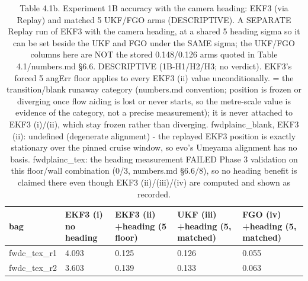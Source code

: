 \begin{table}[htbp]
\centering
\footnotesize
\caption{Table 4.1b. Experiment 1B accuracy with the camera heading: EKF3 (via Replay) and matched 5\textdegree{} UKF/FGO arms (DESCRIPTIVE). A SEPARATE Replay run of EKF3 with the camera heading, at a shared 5\textdegree{} heading sigma so it can be set beside the UKF and FGO under the SAME sigma; the UKF/FGO columns here are NOT the stored 0.148\textdegree{}/0.126\textdegree{} arms quoted in Table 4.1/numbers.md \S{}6.6. DESCRIPTIVE (1B-H1/H2/H3; no verdict). EKF3's forced 5\textdegree{} angErr floor applies to every EKF3 (ii) value unconditionally. \textdagger{} = the transition/blank runaway category (numbers.md convention; position is frozen or diverging once flow aiding is lost or never starts, so the metre-scale value is evidence of the category, not a precise measurement); it is never attached to EKF3 (i)/(ii), which stay frozen rather than diverging. fwdplainc\_blank, EKF3 (ii): undefined (degenerate alignment) - the replayed EKF3 position is exactly stationary over the pinned cruise window, so evo's Umeyama alignment has no basis. fwdplainc\_tex: the heading measurement FAILED Phase 3 validation on this floor/wall combination (0/3, numbers.md \S{}6.6/8), so no heading benefit is claimed there even though EKF3 (ii)/(iii)/(iv) are computed and shown as recorded.}
\label{tab:4-1b}
\begin{tabular}{p{}p{}p{}p{}p{}}
\toprule
\textbf{bag} & \textbf{EKF3 (i) no heading} & \textbf{EKF3 (ii) +heading (5\textdegree{} floor)} & \textbf{UKF (iii) +heading (5\textdegree{}, matched)} & \textbf{FGO (iv) +heading (5\textdegree{}, matched)} \\
\midrule
fwdc\_tex\_r1 & 4.093 & 0.125 & 0.126 & 0.055 \\
fwdc\_tex\_r2 & 3.603 & 0.139 & 0.133 & 0.063 \\

\end{tabular}
\end{table}
